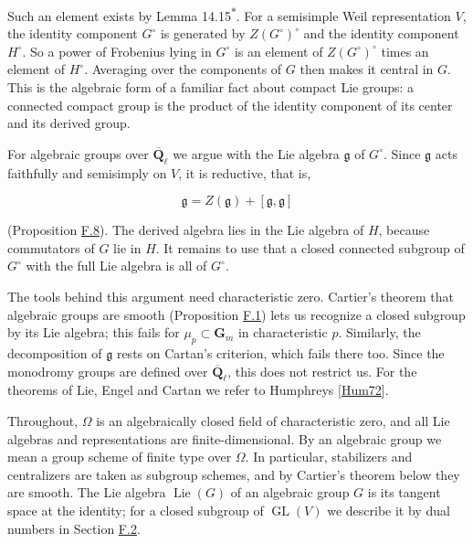 \documentclass[11pt]{article}
\newcommand{\bpout}[1]{#1\textsuperscript{\hyperlink{bp-outside}{\ensuremath{\ast}}}}
\providecommand{\GL}{}\renewcommand{\GL}{\operatorname{GL}}
\begin{document}
Such an element exists by Lemma \bpout{14.15}. For a semisimple Weil representation \(V\), the identity component \(G^\circ\) is generated by \(Z(G^\circ)^\circ\) and the identity component \(H^\circ\). So a power of Frobenius lying in \(G^\circ\) is an element of \(Z(G^\circ)^\circ\) times an element of \(H^\circ\). Averaging over the components of \(G\) then makes it central in \(G\). This is the algebraic form of a familiar fact about compact Lie groups: a connected compact group is the product of the identity component of its center and its derived group.

For algebraic groups over \(\overline{\mathbf Q}_\ell\) we argue with the Lie algebra \(\mathfrak g\) of \(G^\circ\). Since \(\mathfrak g\) acts faithfully and semisimply on \(V\), it is reductive, that is,

\[
\mathfrak g=Z(\mathfrak g)+[\mathfrak g,\mathfrak g]
\]

(Proposition \hyperref[bp28]{F.8}). The derived algebra lies in the Lie algebra of \(H\), because commutators of \(G\) lie in \(H\). It remains to use that a closed connected subgroup of \(G^\circ\) with the full Lie algebra is all of \(G^\circ\).

The tools behind this argument need characteristic zero. Cartier's theorem that algebraic groups are smooth (Proposition \hyperref[bp5]{F.1}) lets us recognize a closed subgroup by its Lie algebra; this fails for \(\mu_p\subset\mathbf G_m\) in characteristic \(p\). Similarly, the decomposition of \(\mathfrak g\) rests on Cartan's criterion, which fails there too. Since the monodromy groups are defined over \(\overline{\mathbf Q}_\ell\), this does not restrict us. For the theorems of Lie, Engel and Cartan we refer to Humphreys [\hyperref[bp30]{Hum72}].

Throughout, \(\Omega\) is an algebraically closed field of characteristic zero, and all Lie algebras and representations are finite-dimensional. By an algebraic group we mean a group scheme of finite type over \(\Omega\). In particular, stabilizers and centralizers are taken as subgroup schemes, and by Cartier's theorem below they are smooth. The Lie algebra \(\operatorname{Lie}(G)\) of an algebraic group \(G\) is its tangent space at the identity; for a closed subgroup of \(\GL(V)\) we describe it by dual numbers in Section \hyperref[bp10]{F.2}.

\end{document}
